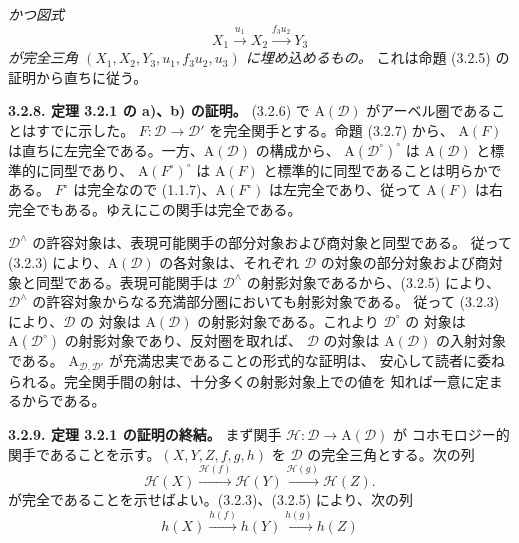 \clearpage
{}%
\begingroup\small\setlength{\parskip}{0pt}\setlength{\emergencystretch}{1.5em}
\noindent\textit{かつ図式}
\[
X_1\xrightarrow{u_1}X_2\xrightarrow{f_3u_2}Y_3
\]
\textit{が完全三角 $(X_1,X_2,Y_3,u_1,f_3u_2,u_3)$ に埋め込めるもの。}
これは命題 (3.2.5) の証明から直ちに従う。

\medskip\noindent\textbf{3.2.8. 定理 3.2.1 の a)、b) の証明。}\quad
(3.2.6) で $\mathrm A(\mathcal D)$ がアーベル圏であることはすでに示した。
$F\colon\mathcal D\to\mathcal D'$ を完全関手とする。命題 (3.2.7) から、
$\mathrm A(F)$ は直ちに左完全である。一方、$\mathrm A(\mathcal D)$ の構成から、
$\mathrm A(\mathcal D^\circ)^\circ$ は $\mathrm A(\mathcal D)$ と標準的に同型であり、
$\mathrm A(F^\circ)^\circ$ は $\mathrm A(F)$ と標準的に同型であることは明らかである。
$F^\circ$ は完全なので (1.1.7)、$\mathrm A(F^\circ)$ は左完全であり、従って
$\mathrm A(F)$ は右完全でもある。ゆえにこの関手は完全である。

$\mathcal D^\wedge$ の許容対象は、表現可能関手の部分対象および商対象と同型である。
従って (3.2.3) により、$\mathrm A(\mathcal D)$ の各対象は、それぞれ
$\mathcal D$ の対象の部分対象および商対象と同型である。表現可能関手は
$\mathcal D^\wedge$ の射影対象であるから、(3.2.5) により、
$\mathcal D^\wedge$ の許容対象からなる充満部分圏においても射影対象である。
従って (3.2.3) により、$\mathcal D$ の
対象は $\mathrm A(\mathcal D)$ の射影対象である。これより $\mathcal D^\circ$ の
対象は $\mathrm A(\mathcal D^\circ)$ の射影対象であり、反対圏を取れば、
$\mathcal D$ の対象は $\mathrm A(\mathcal D)$ の入射対象である。
$\mathrm A_{\mathcal D,\mathcal D'}$ が充満忠実であることの形式的な証明は、
安心して読者に委ねられる。完全関手間の射は、十分多くの射影対象上での値を
知れば一意に定まるからである。

\medskip\noindent\textbf{3.2.9. 定理 3.2.1 の証明の終結。}
まず関手 $\mathcal H\colon\mathcal D\to\mathrm A(\mathcal D)$ が
コホモロジー的関手であることを示す。$(X,Y,Z,f,g,h)$ を
$\mathcal D$ の完全三角とする。次の列
\[
\mathcal H(X)\xrightarrow{\mathcal H(f)}\mathcal H(Y)
\xrightarrow{\mathcal H(g)}\mathcal H(Z).
\]
が完全であることを示せばよい。(3.2.3)、(3.2.5) により、次の列
\[
h(X)\xrightarrow{h(f)}h(Y)\xrightarrow{h(g)}h(Z)
\tag{3.2.9.1}
\]
\endgroup
